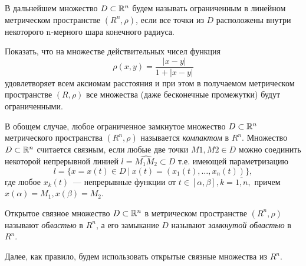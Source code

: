 \documentclass[../../main.tex]{subfiles}
\begin{document}
	
	В дальнейшем множество $D \subset \mathbb{R}^n$ будем называть ограниченным в линейном метрическом пространстве $ (R^n, \rho) $, если все точки из $D$ расположены внутри некоторого n-мерного шара конечного радиуса.
	
	\begin{exc}
		Показать, что на множестве действительных чисел функция 
		$$ 
			\rho(x, y) = \frac{|x - y|}{1 + |x - y|}
		$$ удовлетворяет всем аксиомам расстояния и при этом в получаемом метрическом пространстве $ (R, \rho) $ все множества (даже бесконечные промежутки) будут ограниченными. 	
 	\end{exc} 
 
	\smallskip	 
	В обощем случае, любое ограниченное замкнутое множество $D \subset \mathbb{R}^n$ метрического пространства $ (R^n, \rho) $ называется \emph{компактом} в $R^n$.
	Множество $D \subset \mathbb{R}^n$ считается связным, если любые две точки $M1,M2 \in D $ можно соединить некоторой непрерывной линией $ l = \widehat{M_1M_2} \subset D$  
	т.е. имеющей параметризацию
	$$
		l = \{x = x(t) \in D\ |\ x(t) = (x_1(t), \dots, x_n(t))\},
	$$
	где любое $x_k(t)$~--- непрерывные функции от $t \in [\alpha, \beta], k = \overline{1,n},$ причем $ x(\alpha) = M_1, x(\beta) = M_2.$
	 
	Открытое связное множество $D \subset \mathbb{R}^n$ в метрическом пространстве $ (R^n, \rho) $ называют \emph{областью} в $R^n$, а его замыкание $D$ называют \emph{замкнутой областью} в $R^n$.
	 
	Далее, как правило, будем использовать открытые связные множества из $R^n$.
	
	
% 
% 
\end{document}
